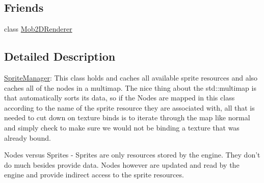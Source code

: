 \subsection*{Friends}
\begin{DoxyCompactItemize}
\item 
\hypertarget{classSpriteManager_a0d669340e63fcad02cde401bbd5bcc23}{
class \hyperlink{classSpriteManager_a0d669340e63fcad02cde401bbd5bcc23}{Mob2DRenderer}}
\label{classSpriteManager_a0d669340e63fcad02cde401bbd5bcc23}

\end{DoxyCompactItemize}


\subsection{Detailed Description}
\hyperlink{classSpriteManager}{SpriteManager}: This class holds and caches all available sprite resources and also caches all of the nodes in a multimap. The nice thing about the std::multimap is that automatically sorts its data, so if the Nodes are mapped in this class according to the name of the sprite resource they are associated with, all that is needed to cut down on texture binds is to iterate through the map like normal and simply check to make sure we would not be binding a texture that was already bound. \par
\par
 Nodes versus Sprites -\/ Sprites are only resources stored by the engine. They don't do much besides provide data. Nodes however are updated and read by the engine and provide indirect access to the sprite resources. 

